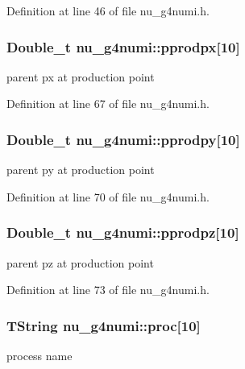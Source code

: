 Definition at line 46 of file nu\-\_\-g4numi.\-h.

\hypertarget{classnu__g4numi_a11ce125811f5f35337733e18f3753d31}{
\subsubsection[{pprodpx}]{\setlength{\rightskip}{0pt plus 5cm}Double\-\_\-t nu\-\_\-g4numi\-::pprodpx\mbox{[}10\mbox{]}}}\label{classnu__g4numi_a11ce125811f5f35337733e18f3753d31}
parent px at production point 

Definition at line 67 of file nu\-\_\-g4numi.\-h.

\hypertarget{classnu__g4numi_a7fa5412e9c5006b884f09226ae2c350a}{
\subsubsection[{pprodpy}]{\setlength{\rightskip}{0pt plus 5cm}Double\-\_\-t nu\-\_\-g4numi\-::pprodpy\mbox{[}10\mbox{]}}}\label{classnu__g4numi_a7fa5412e9c5006b884f09226ae2c350a}
parent py at production point 

Definition at line 70 of file nu\-\_\-g4numi.\-h.

\hypertarget{classnu__g4numi_a0bd7772ccdfe00660ce45d94c107a240}{
\subsubsection[{pprodpz}]{\setlength{\rightskip}{0pt plus 5cm}Double\-\_\-t nu\-\_\-g4numi\-::pprodpz\mbox{[}10\mbox{]}}}\label{classnu__g4numi_a0bd7772ccdfe00660ce45d94c107a240}
parent pz at production point 

Definition at line 73 of file nu\-\_\-g4numi.\-h.

\hypertarget{classnu__g4numi_a6583de2ce34a5d19409c09cc0b63692f}{
\subsubsection[{proc}]{\setlength{\rightskip}{0pt plus 5cm}T\-String nu\-\_\-g4numi\-::proc\mbox{[}10\mbox{]}}}\label{classnu__g4numi_a6583de2ce34a5d19409c09cc0b63692f}
process name 

